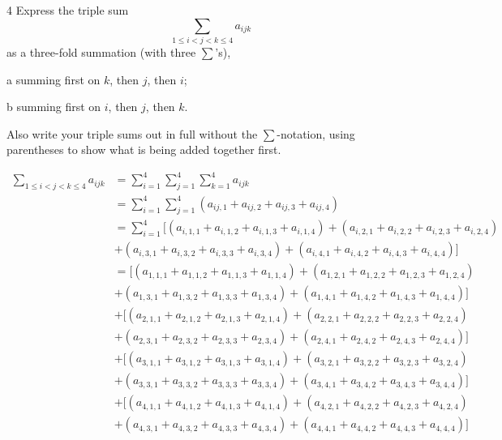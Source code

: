 \documentclass[a4paper,12pt]{article}
\makeatletter
\newtheorem*{solution}{Solution}
\theoremstyle{definition}
\renewenvironment{solution}[1][Solution] {\par\pushQED{\qed}\normalfont\topsep6\p@\@plus6\p@\relax\trivlist\item[\hskip\labelsep\bfseries#1\@addpunct{.}]\ignorespaces}{\popQED\endtrivlist\@endpefalse} \makeatother
\newenvironment{problems}{\begin{list}{}{\renewcommand{\makelabel}[1]{\textbf{##1}\hfil}}}{\end{list}}
\newenvironment{steps}{\begin{list}{}{\renewcommand{\makelabel}[1]{\textbf{##1}\hfil}}}{\end{list}}
\makeatother
\begin{document}
\begin{problems}
\begin{solution}
    \end{solution}
    \item[4] Express the triple sum
    \begin{equation*}
        \sum_{1\leq i<j<k\leq 4}a_{ijk}
    \end{equation*} 
    as a three-fold summation (with three $\sum$'s),
    \begin{steps}
        \item[a] summing first on $k$, then $j$, then $i$;
        \item[b] summing first on $i$, then $j$, then $k$. 
    \end{steps}
    Also write your triple sums out in full without the $\sum$-notation, using parentheses to show what is being added together first.
    \begin{solution}
        \begin{align*}
            \sum_{1\leq i<j<k\leq 4}a_{ijk} &= \sum_{i=1}^4\sum_{j=1}^4\sum_{k=1}^4 a_{ijk} \\&= \sum_{i=1}^4\sum_{j=1}^4 (a_{ij,1} + a_{ij,2} + a_{ij,3} + a_{ij,4}) \\
            &= \sum_{i=1}^4[(a_{i,1,1} + a_{i,1,2} + a_{i,1,3} + a_{i,1,4})+(a_{i,2,1} + a_{i,2,2} + a_{i,2,3} + a_{i,2,4})\\&+(a_{i,3,1} + a_{i,3,2} + a_{i,3,3} + a_{i,3,4})+(a_{i,4,1} + a_{i,4,2} + a_{i,4,3} + a_{i,4,4})]\\
            &= [(a_{1,1,1} + a_{1,1,2} + a_{1,1,3} + a_{1,1,4})+(a_{1,2,1} + a_{1,2,2} + a_{1,2,3} + a_{1,2,4})\\&+(a_{1,3,1} + a_{1,3,2} + a_{1,3,3} + a_{1,3,4})+(a_{1,4,1} + a_{1,4,2} + a_{1,4,3} + a_{1,4,4})]\\&+[(a_{2,1,1} + a_{2,1,2} + a_{2,1,3} + a_{2,1,4})+(a_{2,2,1} + a_{2,2,2} + a_{2,2,3} + a_{2,2,4})\\&+(a_{2,3,1} + a_{2,3,2} + a_{2,3,3} + a_{2,3,4})+(a_{2,4,1} + a_{2,4,2} + a_{2,4,3} + a_{2,4,4})]\\&+[(a_{3,1,1} + a_{3,1,2} + a_{3,1,3} + a_{3,1,4})+(a_{3,2,1} + a_{3,2,2} + a_{3,2,3} + a_{3,2,4})\\&+(a_{3,3,1} + a_{3,3,2} + a_{3,3,3} + a_{3,3,4})+(a_{3,4,1} + a_{3,4,2} + a_{3,4,3} + a_{3,4,4})]\\&+[(a_{4,1,1} + a_{4,1,2} + a_{4,1,3} + a_{4,1,4})+(a_{4,2,1} + a_{4,2,2} + a_{4,2,3} + a_{4,2,4})\\&+(a_{4,3,1} + a_{4,3,2} + a_{4,3,3} + a_{4,3,4})+(a_{4,4,1} + a_{4,4,2} + a_{4,4,3} + a_{4,4,4})]
        \end{align*}

\end{solution}
\end{problems}
\end{document}
